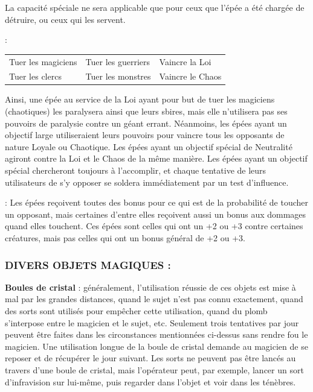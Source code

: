 {\bigskip

La capacité spéciale ne sera applicable que pour ceux que l'épée a été chargée de détruire, ou ceux qui les servent.

:

\medskip

{\parindent1.5cm\begin{tabular}{p{4.6cm}p{4.6cm}p{4.6cm}}
Tuer les magiciens & Tuer les guerriers & Vaincre la Loi \\
Tuer les clercs & Tuer les monstres & Vaincre le Chaos \\
\end{tabular}}

\bigskip

Ainsi, une épée au service de la Loi ayant pour but de tuer les magiciens (chaotiques) les paralysera ainsi que leurs sbires, mais elle n'utilisera pas ses pouvoirs de paralysie contre un géant errant. Néanmoins, les épées ayant un objectif large utiliseraient leurs pouvoirs pour vaincre tous les opposants de nature Loyale ou Chaotique. Les épées ayant un objectif spécial de Neutralité agiront contre la Loi et le Chaos de la même manière. Les épées ayant un objectif spécial chercheront toujours à l'accomplir, et chaque tentative de leurs utilisateurs de s'y opposer se soldera immédiatement par un test d'influence.

\bigskip

 : Les épées reçoivent toutes des bonus pour ce qui est de la probabilité de toucher un opposant, mais certaines d'entre elles reçoivent aussi un bonus aux dommages quand elles touchent. Ces épées sont celles qui ont un +2 ou +3 contre certaines créatures, mais pas celles qui ont un bonus général de +2 ou +3.



\subsubsection*{DIVERS OBJETS MAGIQUES :}

\label{objet-boule-cristal}\textbf{Boules de cristal} : généralement, l'utilisation réussie de ces objets est mise à mal par les grandes distances, quand le sujet n'est pas connu exactement, quand des sorts sont utilisés pour empêcher cette utilisation, quand du plomb s'interpose entre le magicien et le sujet, etc. Seulement trois tentatives par jour peuvent être faites dans les circonstances mentionnées ci-dessus sans rendre fou le magicien. Une utilisation longue de la boule de cristal demande au magicien de se reposer et de récupérer le jour suivant. Les sorts ne peuvent pas être lancés au travers d'une boule de cristal, mais l'opérateur peut, par exemple, lancer un sort d'infravision sur lui-même, puis regarder dans l'objet et voir dans les ténèbres.

}
